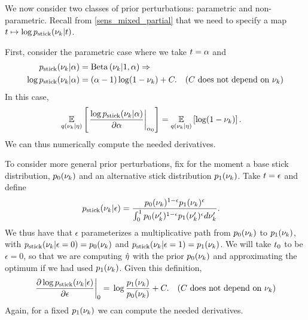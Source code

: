 We now consider two classes of prior perturbations: parametric and
non-parametric.  Recall from \eqref{sens_mixed_partial} that we
need to specify a map $t \mapsto \log p_{\mathrm{stick}}(\nu_{k} \vert t)$.

First, consider the parametric case where we take $t = \alpha$ and
%
\begin{align*}
%
\pstick(\nuk \vert \alpha) ={}&
    \betadist{\nuk \vert 1, \alpha} \Rightarrow\\
\log \pstick(\nuk \vert \alpha) ={}&
    (\alpha - 1) \log(1 - \nuk) + \const. &
    \constdesc{\nuk}
%
\end{align*}
%
In this case,
%
\begin{align*}
%
\expect{\q(\nuk \vert \eta)}
       {\fracat{\log \pstick(\nuk \vert \alpha)}{\partial \alpha}{\alpha_0}
} ={}&
    \expect{\q(\nuk \vert \eta)}{\log(1 - \nuk)}.
%
\end{align*}
%
We can thus numerically compute the needed derivatives.

To consider more general prior perturbations, fix for the moment a base stick
distribution, $p_{0}(\nu_{k})$ and an alternative stick distribution
$p_{1}(\nu_{k})$.  Take $t = \epsilon$ and define
%
\begin{align*}
%
\pstick(\nuk \vert \epsilon) ={}&
\frac{\pb(\nuk)^{1 - \epsilon} \pa(\nuk)^\epsilon}
     {\int_0^1 \pb(\nuk')^{1 - \epsilon} \pa(\nuk')^\epsilon d\nuk'}.
%
\end{align*}
%
We thus have that $\epsilon$ parameterizes a multiplicative path from
$p_{0}(\nu_{k})$ to $p_{1}(\nu_{k})$, with $p_{\mathrm{stick}}(\nu_{k} \vert \epsilon = 0) = p_{0}(\nu_{k})$
and $p_{\mathrm{stick}}(\nu_{k} \vert \epsilon=1) = p_{1}(\nu_{k})$.  We will take
$t_0$ to be $\epsilon = 0$, so that we are computing $\hat\eta$ with the
prior $p_{0}(\nu_{k})$ and approximating the optimum if we had used $p_{1}(\nu_{k})$.
%
Given this definition,
%
\begin{align*}
%
\fracat{\partial \log \pstick(\nuk \vert \epsilon) }{\partial \epsilon}{0} ={}&
    \log \frac{\pa(\nuk)}{\pb(\nuk)} + \const.
    & \constdesc{\nuk}
%
\end{align*}
%
Again, for a fixed $p_{1}(\nu_{k})$ we can compute the needed derivatives.

